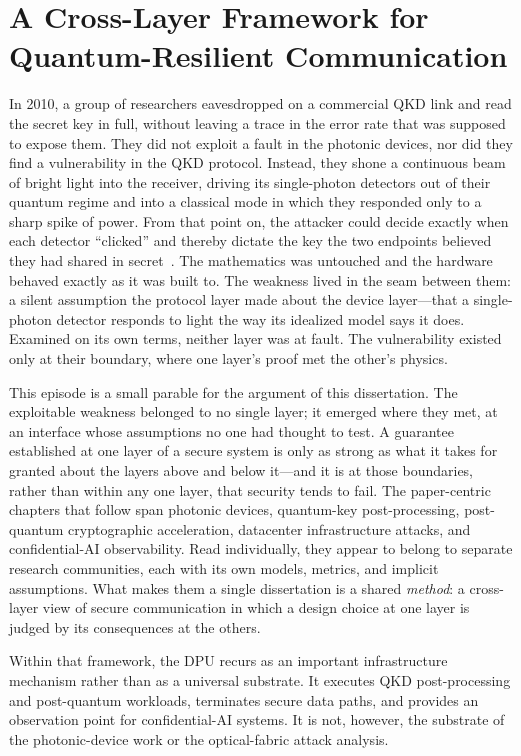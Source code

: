 \chapter{A Cross-Layer Framework for Quantum-Resilient Communication}
\label{ch:background}

In 2010, a group of researchers eavesdropped on a commercial QKD link and read
the secret key in full, without leaving a trace
in the error rate that was supposed to expose them. 
They did not exploit a fault in the photonic devices, nor did they find a vulnerability in the
QKD protocol. 
Instead, they shone a continuous beam of bright light
into the receiver, driving its single-photon detectors out of their quantum
regime and into a classical mode in which they responded only to a sharp spike of
power. From that point on, the attacker could decide exactly when each detector
``clicked'' and thereby dictate the key the two endpoints believed they had shared
in secret~\cite{lydersen2010hacking}.
The mathematics was untouched and the hardware behaved exactly as it was built to.
The weakness lived in the seam between them: a silent assumption the protocol layer
made about the device layer---that a single-photon detector responds to light the
way its idealized model says it does. Examined on its own terms, neither layer was
at fault. The vulnerability existed only at their boundary, where one layer's proof
met the other's physics.

This episode is a small parable for the argument of this dissertation. The
exploitable weakness belonged to no single layer; it emerged where they met, at an
interface whose assumptions no one had thought to test. A guarantee established at
one layer of a secure system is only as strong as what it takes for granted about
the layers above and below it---and it is at those boundaries, rather than within
any one layer, that security tends to fail. The paper-centric chapters that follow span photonic devices, quantum-key
post-processing, post-quantum cryptographic acceleration, datacenter
infrastructure attacks, and confidential-AI observability. Read individually, they appear to belong to separate
research communities, each with its own models, metrics, and implicit assumptions.
What makes them a single dissertation is a shared \emph{method}: a cross-layer
view of secure communication in which a design choice at one layer is judged by its
consequences at the others.

Within that framework, the DPU recurs as an important
infrastructure mechanism rather than as a universal substrate. It executes QKD
post-processing and post-quantum workloads, terminates secure data paths, and
provides an observation point for confidential-AI systems. It is not, however, the
substrate of the photonic-device work or the optical-fabric attack analysis.

